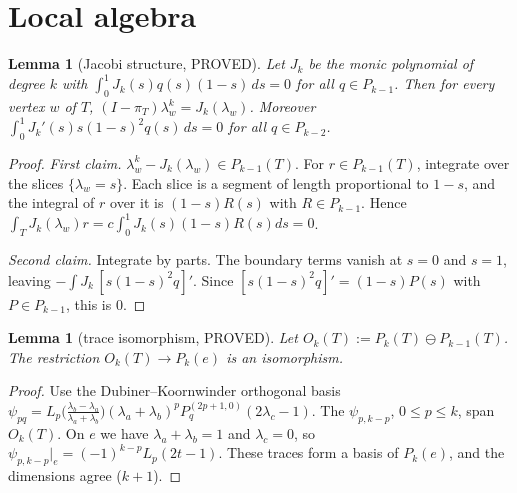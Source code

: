 \documentclass[11pt]{article}
\newtheorem{lemma}[theorem]{Lemma}
\theoremstyle{remark}
\begin{document}
\section{Local algebra}
\begin{lemma}[Jacobi structure, PROVED]\label{lem:jac}
Let $J_k$ be the monic polynomial of degree $k$ with $\int_0^1J_k(s)q(s)(1-s)\,ds=0$ for all $q\in P_{k-1}$. Then for every vertex
$w$ of $T$, $(I-\pi_T)\lambda_w^k=J_k(\lambda_w)$. Moreover $\int_0^1J_k'(s)s(1-s)^2q(s)\,ds=0$ for all $q\in P_{k-2}$.
\end{lemma}
\begin{proof}
\emph{First claim.} $\lambda_w^k-J_k(\lambda_w)\in P_{k-1}(T)$. For $r\in P_{k-1}(T)$, integrate over the slices
$\{\lambda_w=s\}$. Each slice is a segment of length proportional to $1-s$, and the integral of $r$ over it is $(1-s)R(s)$ with
$R\in P_{k-1}$. Hence $\int_TJ_k(\lambda_w)r=c\int_0^1J_k(s)(1-s)R(s)ds=0$.

\emph{Second claim.} Integrate by parts. The boundary terms vanish at $s=0$ and $s=1$, leaving
$-\int J_k\,[s(1-s)^2q]'$. Since $[s(1-s)^2q]'=(1-s)P(s)$ with $P\in P_{k-1}$, this is $0$.
\end{proof}

\begin{lemma}[trace isomorphism, PROVED]\label{lem:trace}
Let $O_k(T):=P_k(T)\ominus P_{k-1}(T)$. The restriction $O_k(T)\to P_k(e)$ is an isomorphism.
\end{lemma}
\begin{proof}
Use the Dubiner--Koornwinder orthogonal basis
$\psi_{pq}=L_p\big(\tfrac{\lambda_b-\lambda_a}{\lambda_a+\lambda_b}\big)(\lambda_a+\lambda_b)^pP^{(2p+1,0)}_q(2\lambda_c-1)$.
The $\psi_{p,k-p}$, $0\le p\le k$, span $O_k(T)$. On $e$ we have $\lambda_a+\lambda_b=1$ and $\lambda_c=0$, so
$\psi_{p,k-p}|_e=(-1)^{k-p}L_p(2t-1)$. These traces form a basis of $P_k(e)$, and the dimensions agree ($k+1$).
\end{proof}
\end{document}

